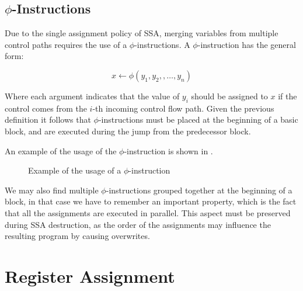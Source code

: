 \subsection{$\phi$-Instructions}
\label{subsec:phi}

Due to the single assignment policy of SSA, merging variables from multiple control paths requires the use of a $\phi$-instructions. A $\phi$-instruction has the general form:

\[
x \leftarrow \phi(y_1, y_2, , \dots, y_n)
\]

Where each argument indicates that the value of $y_i$ should be assigned to $x$ if the control comes from the $i$-th incoming control flow path. Given the previous definition it follows that $\phi$-instructions must be placed at the beginning of a basic block, and are executed during the jump from the predecessor block.

An example of the usage of the $\phi$-instruction is shown in .

\begin{figure}[ht]
    \centering
    \caption{Example of the usage of a $\phi$-instruction}
    \label{fig:phi-usage}
\end{figure}

We may also find multiple $\phi$-instructions grouped together at the beginning of a block, in that case we have to remember an important property, which is the fact that all the assignments are executed in parallel. This aspect must be preserved during SSA destruction, as the order of the assignments may influence the resulting program by causing overwrites.

\section{Register Assignment}
\label{sec:ra}

